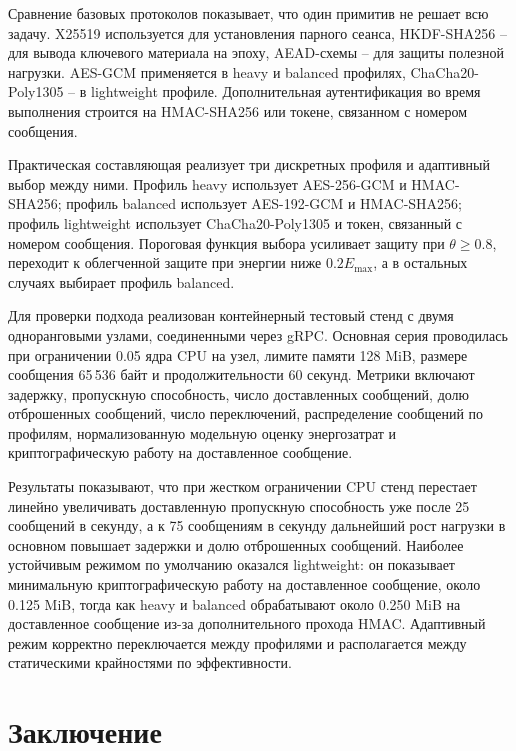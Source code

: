 \documentclass[14pt,a4paper]{extarticle}
\newcommand{\annotationsection}[1]{%
  \section*{#1}%
  \addcontentsline{toc}{section}{#1}%
}
\begin{document}
Сравнение базовых протоколов показывает, что один примитив не решает всю задачу. X25519 используется для установления парного сеанса, HKDF-SHA256 -- для вывода ключевого материала на эпоху, AEAD-схемы -- для защиты полезной нагрузки. AES-GCM применяется в \textenglish{heavy} и \textenglish{balanced} профилях, ChaCha20-Poly1305 -- в \textenglish{lightweight} профиле. Дополнительная аутентификация во время выполнения строится на HMAC-SHA256 или токене, связанном с номером сообщения.

Практическая составляющая реализует три дискретных профиля и адаптивный выбор между ними. Профиль \textenglish{heavy} использует AES-256-GCM и HMAC-SHA256; профиль \textenglish{balanced} использует AES-192-GCM и HMAC-SHA256; профиль \textenglish{lightweight} использует ChaCha20-Poly1305 и токен, связанный с номером сообщения. Пороговая функция выбора усиливает защиту при \(\theta \geq 0.8\), переходит к облегченной защите при энергии ниже \(0.2E_{\max}\), а в остальных случаях выбирает профиль \textenglish{balanced}.

Для проверки подхода реализован контейнерный тестовый стенд с двумя одноранговыми узлами, соединенными через gRPC. Основная серия проводилась при ограничении 0.05 ядра CPU на узел, лимите памяти 128 MiB, размере сообщения 65\,536 байт и продолжительности 60 секунд. Метрики включают задержку, пропускную способность, число доставленных сообщений, долю отброшенных сообщений, число переключений, распределение сообщений по профилям, нормализованную модельную оценку энергозатрат и криптографическую работу на доставленное сообщение.

Результаты показывают, что при жестком ограничении CPU стенд перестает линейно увеличивать доставленную пропускную способность уже после 25 сообщений в секунду, а к 75 сообщениям в секунду дальнейший рост нагрузки в основном повышает задержки и долю отброшенных сообщений. Наиболее устойчивым режимом по умолчанию оказался \textenglish{lightweight}: он показывает минимальную криптографическую работу на доставленное сообщение, около 0.125 MiB, тогда как \textenglish{heavy} и \textenglish{balanced} обрабатывают около 0.250 MiB на доставленное сообщение из-за дополнительного прохода HMAC. Адаптивный режим корректно переключается между профилями и располагается между статическими крайностями по эффективности.

\annotationsection{Заключение}
\end{document}
